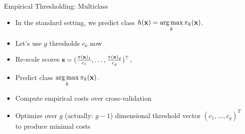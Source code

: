 \documentclass[10pt,compress,t,notes=noshow, xcolor=table]{beamer}
\begin{document}
\begin{frame}{Empirical Thresholding: Multiclass}
    \begin{itemize}
        
        
            \item In the standard setting, we predict class $h(\mathbf{x}) = \mathop{\mathrm{arg\,max}}\limits_{k} \pi_{k}(\mathbf{x})$.
            
            \item Let's use $g$ thresholds $c_k$ now 
            
            \item Re-scale scores $ \mathbf{s} = (\frac{\pi(\mathbf{x})_1}{c_1},\ldots, \frac{\pi(\mathbf{x})_g}{ c_g})^\top$, 
            \item Predict class $\mathop{\mathrm{arg\,max}}\limits_k \pi_{k}(\mathbf{x}) $.

            \item Compute empirical costs over cross-validation

            \item Optimize over $g$ (actually: $g-1$) dimensional threshold vector $(c_1, \ldots, c_g)^T$ to produce minimal costs

    \end{itemize}
\end{frame}

%
%                   
%
\end{document}
